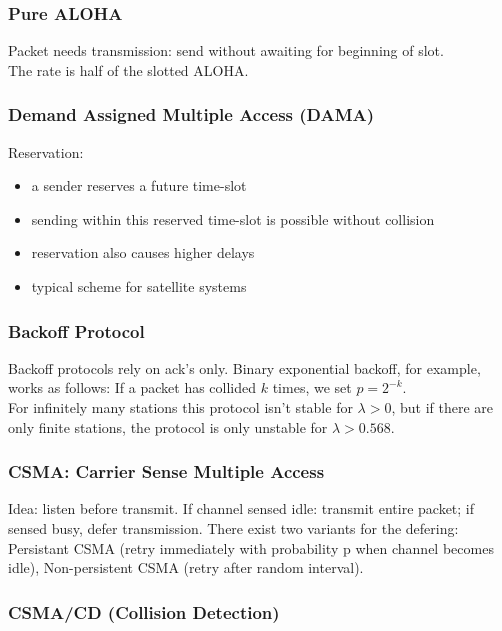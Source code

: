 \documentclass[10pt, a4paper, twocolumn]{scrartcl}
\begin{document}
\subsubsection{Pure ALOHA}

Packet needs transmission:  send without awaiting for beginning of slot.\\

The rate is half of the slotted ALOHA.

\subsubsection{Demand Assigned Multiple Access (DAMA)}

Reservation:
\begin{itemize}
	\item a sender reserves a future time-slot
	\item sending within this reserved time-slot is possible without collision
	\item reservation also causes higher delays
	\item typical scheme for satellite systems
\end{itemize}

\subsubsection{Backoff Protocol}

Backoff protocols rely on ack's only. Binary exponential backoff, for example, works as follows: If a packet has collided $k$ times, we set $p = 2^{-k}$.\\

For infinitely many stations this protocol isn't stable for $\lambda > 0$, but if there are only finite stations, the protocol is only unstable for $\lambda > 0.568$.

\subsubsection{CSMA: Carrier Sense Multiple Access}

Idea: listen before transmit. If channel sensed idle: transmit entire packet; if sensed busy, defer transmission. There exist two variants for the defering: Persistant CSMA (retry immediately with probability p when channel becomes idle), Non-persistent CSMA (retry after random interval).

\subsubsection{CSMA/CD (Collision Detection)}
\end{document}
